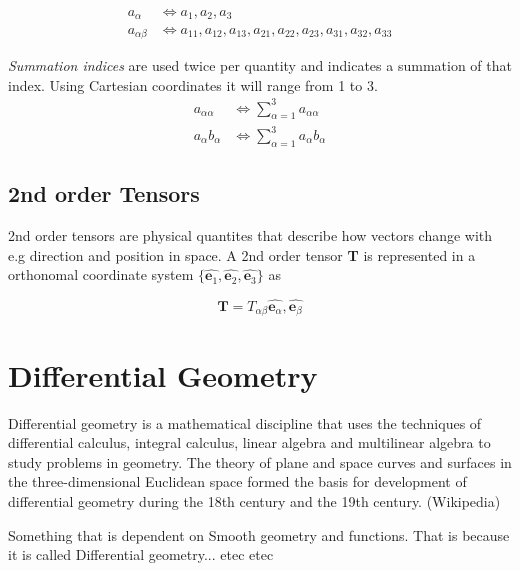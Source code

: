 \begin{align*} 
    a_\alpha  &\Leftrightarrow a_1 , a_2, a_3 \\ 
   a_{\alpha \beta}  &\Leftrightarrow a_{11},a_{12},a_{13},a_{21},a_{22},a_{23},a_{31},a_{32},a_{33}
\end{align*}

\textit{Summation indices} are used twice per quantity and indicates a  summation of that index. Using Cartesian coordinates it will range from 1 to 3.
\begin{align*} 
    a_{\alpha \alpha}  &\Leftrightarrow \sum\limits_{\alpha=1}^3  a_{\alpha \alpha} \\ 
   a_{\alpha}b_\alpha  &\Leftrightarrow \sum\limits_{\alpha=1}^3  a_{\alpha}b_\alpha 
\end{align*}

\subsection{2nd order Tensors}
2nd order tensors are physical quantites that describe how vectors change with e.g direction and position in space. A 2nd order tensor \textbf{T} is represented in a orthonomal coordinate system $\{\hat{\textbf{e}_1},\hat{\textbf{e}_2} , \hat{\textbf{e}_3}\}$ as

\begin{equation}
\textbf{T} = T_{\alpha\beta}\hat{\textbf{e}_\alpha},\hat{\textbf{e}_\beta}
\end{equation}


\section{Differential Geometry}

Differential geometry is a mathematical discipline that uses the techniques of differential calculus, integral calculus, linear algebra and multilinear algebra to study problems in geometry. The theory of plane and space curves and surfaces in the three-dimensional Euclidean space formed the basis for development of differential geometry during the 18th century and the 19th century. (Wikipedia)

Something that is dependent on Smooth geometry and functions. That is because it is called Differential geometry... etec etec 


